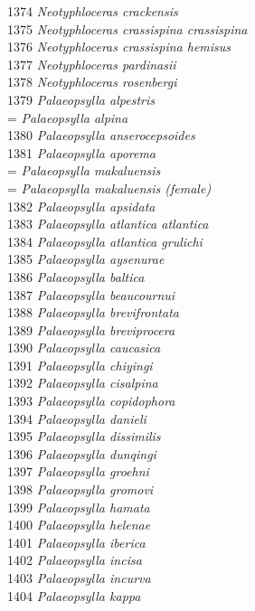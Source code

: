 \documentclass[
]{article}
\begin{document}
1374 \emph{Neotyphloceras crackensis}\\
1375 \emph{Neotyphloceras crassispina crassispina}\\
1376 \emph{Neotyphloceras crassispina hemisus}\\
1377 \emph{Neotyphloceras pardinasii}\\
1378 \emph{Neotyphloceras rosenbergi}\\
1379 \emph{Palaeopsylla alpestris}\\
= \emph{Palaeopsylla alpina}\\
1380 \emph{Palaeopsylla anserocepsoides}\\
1381 \emph{Palaeopsylla aporema}\\
= \emph{Palaeopsylla makaluensis}\\
= \emph{Palaeopsylla makaluensis (female)}\\
1382 \emph{Palaeopsylla apsidata}\\
1383 \emph{Palaeopsylla atlantica atlantica}\\
1384 \emph{Palaeopsylla atlantica grulichi}\\
1385 \emph{Palaeopsylla aysenurae}\\
1386 \emph{Palaeopsylla baltica}\\
1387 \emph{Palaeopsylla beaucournui}\\
1388 \emph{Palaeopsylla brevifrontata}\\
1389 \emph{Palaeopsylla breviprocera}\\
1390 \emph{Palaeopsylla caucasica}\\
1391 \emph{Palaeopsylla chiyingi}\\
1392 \emph{Palaeopsylla cisalpina}\\
1393 \emph{Palaeopsylla copidophora}\\
1394 \emph{Palaeopsylla danieli}\\
1395 \emph{Palaeopsylla dissimilis}\\
1396 \emph{Palaeopsylla dunqingi}\\
1397 \emph{Palaeopsylla groehni}\\
1398 \emph{Palaeopsylla gromovi}\\
1399 \emph{Palaeopsylla hamata}\\
1400 \emph{Palaeopsylla helenae}\\
1401 \emph{Palaeopsylla iberica}\\
1402 \emph{Palaeopsylla incisa}\\
1403 \emph{Palaeopsylla incurva}\\
1404 \emph{Palaeopsylla kappa}\\
\end{document}
